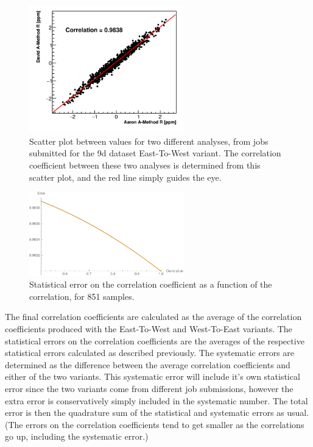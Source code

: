 \begin{figure}[]
\centering
\includegraphics[width=0.6\textwidth]{ScatterPlot}
\caption{Scatter plot between \R values for two different analyses, from jobs submitted for the 9d dataset East-To-West variant. The correlation coefficient between these two analyses is determined from this scatter plot, and the red line simply guides the eye.}
\label{fig:scatterPlot}
\end{figure}


\begin{figure}[]
\centering
\includegraphics[width=0.6\textwidth]{StatisticalError}
\caption{Statistical error on the correlation coefficient as a function of the correlation, for 851 samples.}
\label{fig:statError}
\end{figure}



The final correlation coefficients are calculated as the average of the correlation coefficients produced with the East-To-West and West-To-East variants. The statistical errors on the correlation coefficients are the averages of the respective statistical errors calculated as described previously. The systematic errors are determined as the difference between the average correlation coefficients and either of the two variants. This systematic error will include it's own statistical error since the two variants come from different job submissions, however the extra error is conservatively simply included in the systematic number. The total error is then the quadrature sum of the statistical and systematic errors as usual. (The errors on the correlation coefficients tend to get smaller as the correlations go up, including the systematic error.)


